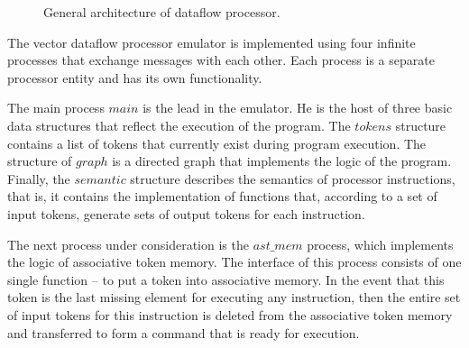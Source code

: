\documentclass[
11pt,%
tightenlines,%
twoside,%
onecolumn,%
nofloats,%
nobibnotes,%
nofootinbib,%
superscriptaddress,%
noshowpacs,%
centertags]%
{revtex4}
\begin{document}
\begin{figure}[h!]
\caption{General architecture of dataflow processor.}
\label{fig:big-scheme}
\end{figure}

The vector dataflow processor emulator is implemented using four infinite processes that exchange messages with each other.
Each process is a separate processor entity and has its own functionality.

The main process $main$ is the lead in the emulator.
He is the host of three basic data structures that reflect the execution of the program.
The $tokens$ structure contains a list of tokens that currently exist during program execution.
The structure of $graph$ is a directed graph that implements the logic of the program.
Finally, the $semantic$ structure describes the semantics of processor instructions, that is, it contains the implementation of functions that, according to a set of input tokens, generate sets of output tokens for each instruction.

The next process under consideration is the $ast\_mem$ process, which implements the logic of associative token memory.
The interface of this process consists of one single function -- to put a token into associative memory.
In the event that this token is the last missing element for executing any instruction, then the entire set of input tokens for this instruction is deleted from the associative token memory and transferred to form a command that is ready for execution.
\end{document}
